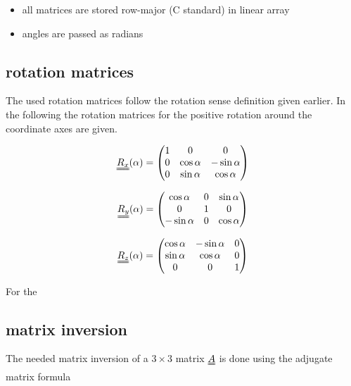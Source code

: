 \begin{itemize}
 \item all matrices are stored row-major (C standard) in linear array
 \item angles are passed as radians
\end{itemize}

\subsection*{rotation matrices}

The used rotation matrices follow the rotation sense definition given earlier. In the following the rotation matrices for the positive rotation around the coordinate axes are given.

\begin{align}
\mat {R_x} ( \alpha ) = \begin{pmatrix}
                       1 & 0 & 0 \\
		       0 & \cos\alpha & -\sin\alpha \\
		       0 & \sin\alpha & \cos\alpha 
                      \end{pmatrix}
\end{align}
 
\begin{align}
\mat {R_y} ( \alpha ) = \begin{pmatrix}
                       \cos\alpha & 0 & \sin\alpha \\
		       0 & 1 & 0 \\
		       -\sin\alpha & 0 & \cos\alpha 
                      \end{pmatrix}
\end{align}

\begin{align}
\mat {R_z} ( \alpha ) = \begin{pmatrix}
		       \cos\alpha & -\sin\alpha & 0 \\
		       \sin\alpha & \cos\alpha  & 0 \\
		       0 & 0 & 1
                      \end{pmatrix}
\end{align}

For the 

\subsection*{matrix inversion}
The needed matrix inversion of a $3\times3$ matrix $\mat A$ is done using the adjugate matrix formula

